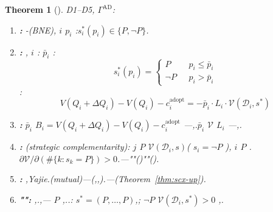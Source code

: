 \documentclass[12pt,a4paper]{article}
\newtheorem{theorem}{Theorem}[section]
\theoremstyle{definition}
\theoremstyle{remark}
\begin{document}
\begin{theorem}[]
\label{thm:mutual-deterrence}
D1--D5, $\Gamma^{\text{AD}}$:

\begin{enumerate}[label=(\roman*), itemsep=6pt]
\item \textbf{:} -(BNE), $i$  $p_i$ :$s_i^*(p_i) \in \{P, \neg P\}$.

\item \textbf{:} , $i$ : $\bar{p}_i$ :
\begin{equation}
s_i^*(p_i) =
\begin{cases}
P & \text{ } p_i \leq \bar{p}_i \\
\neg P & \text{ } p_i > \bar{p}_i
\end{cases}
\label{eq:threshold-strategy}
\end{equation}
:
\begin{equation}
V(Q_i + \Delta Q_i) - V(Q_i) - c_i^{\text{adopt}} = -\bar{p}_i \cdot L_i \cdot \mathcal{V}(\mathcal{D}_i, s^*)
\label{eq:threshold-condition}
\end{equation}

\item \textbf{:} $\bar{p}_i$  $B_i = V(Q_i + \Delta Q_i) - V(Q_i) - c_i^{\text{adopt}}$ ---,.$\bar{p}_i$  $\mathcal{V}$  $L_i$ ---,.

\item \textbf{:} (strategic complementarity): $j$  $P$  $\mathcal{V}(\mathcal{D}_i, s)$( $s_i = \neg P$ ), $i$  $P$ . $\partial \mathcal{V} / \partial (\#\{k: s_k = P\}) > 0$.---""()""().

\item \textbf{:} ,\textit{}Yajie.\textbf{}(mutual)---(,,).\textbf{}---(Theorem~\ref{thm:scx-up}).

\item \textbf{"":} \textit{},\textit{}.,\textit{}--- $P$ ,..: $s^* = (P, \ldots, P)$,; $\neg P$  $\mathcal{V}(\mathcal{D}_i, s^*) > 0$ ,.
\end{enumerate}
\end{theorem}
\end{document}

